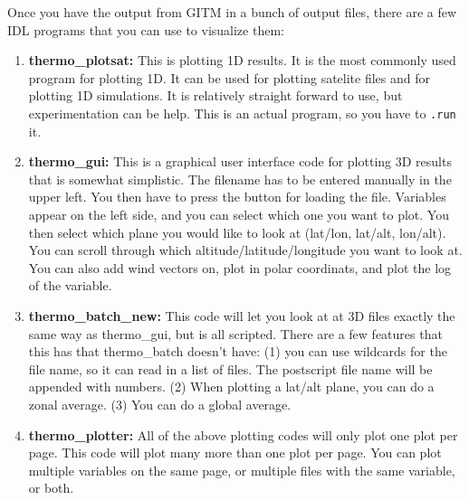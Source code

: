 
Once you have the output from GITM in a bunch of output files, there
are a few IDL programs that you can use to visualize them:
\begin{enumerate}
\item {\bf thermo\_plotsat:} This is plotting 1D results.  It is the
  most commonly used program for plotting 1D.  It can be used for
  plotting satelite files and for plotting 1D simulations.  It is
  relatively straight forward to use, but experimentation can be help.
  This is an actual program, so you have to {\tt .run} it.
\item {\bf thermo\_gui:} This is a graphical user interface code for
  plotting 3D results that is somewhat simplistic.  The filename has
  to be entered manually in the upper left.  You then have to press
  the button for loading the file.  Variables appear on the left side,
  and you can select which one you want to plot.  You then select
  which plane you would like to look at (lat/lon, lat/alt, lon/alt).
  You can scroll through which altitude/latitude/longitude you want to
  look at.  You can also add wind vectors on, plot in polar
  coordinats, and plot the log of the variable.
\item {\bf thermo\_batch\_new:} This code will let you look at at 3D
  files exactly the same way as thermo\_gui, but is all scripted.
  There are a few features that this has that thermo\_batch doesn't
  have: (1) you can use wildcards for the file name, so it can read in
  a list of files.  The postscript file name will be appended with
  numbers. (2) When plotting a lat/alt plane, you can do a zonal
  average. (3) You can do a global average.
\item {\bf thermo\_plotter:} All of the above plotting codes will only
  plot one plot per page.  This code will plot many more than one plot
  per page.  You can plot multiple variables on the same page, or multiple
  files with the same variable, or both.
\end{enumerate}


